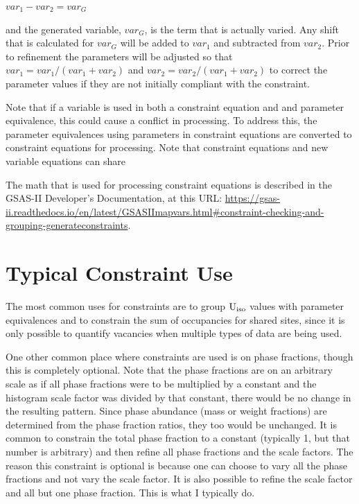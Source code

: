     $var_1 - var_2 = var_G$

and the generated variable, $var_G$, is the term that is actually varied. Any shift that is calculated for $var_G$ will be added to $var_1$ and subtracted from $var_2$. Prior to refinement the parameters will be adjusted so that $var_1 = var_1 / (var_1 + var_2)$ and $var_2 = var_2 / (var_1 + var_2)$ to correct the parameter values if they are not initially compliant with the constraint. 

Note that if a variable is used in both a constraint equation and and parameter equivalence, this could cause a conflict in processing. To address this, the parameter equivalences using parameters in constraint equations are converted to constraint equations for processing. Note that constraint equations and new variable equations can share 

The math that is used for processing constraint equations is described in the GSAS-II Developer's Documentation, at this URL:
\url{https://gsas-ii.readthedocs.io/en/latest/GSASIImapvars.html\#constraint-checking-and-grouping-generateconstraints}.

\section{Typical Constraint Use}

The most common uses for constraints are to group $\rm U_{iso}$ values with parameter equivalences and to constrain the sum of occupancies for shared sites, since it is only possible to quantify vacancies when multiple types of data are being used. 

\label{ref:scalingfactors}
One other common place where constraints are used is on phase fractions, though this is completely optional. Note that the phase fractions are on an arbitrary scale as if all phase fractions were to be multiplied by a constant and the histogram scale factor was divided by that constant, there would be no change in the resulting pattern. Since phase abundance (mass or weight fractions) are determined from the phase fraction ratios, they too would be unchanged. It is common to constrain the total phase fraction to a constant (typically 1, but that number is arbitrary) and then refine all phase fractions and the scale factors. The reason this constraint is optional is because one can choose to vary all the phase fractions and not vary the scale factor. It is also possible to refine the scale factor and all but one phase fraction. This is what I typically do. 

